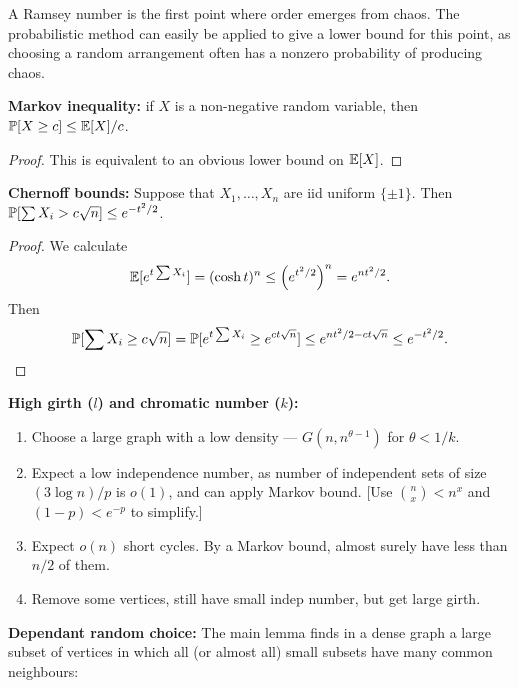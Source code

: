 \documentclass[11pt]{article}
\begin{document}
\begin{recent}
\begin{itemise}
\item A Ramsey number is the first point where order emerges from chaos. The probabilistic method can easily be applied to give a lower bound for this point, as choosing a random arrangement often has a nonzero probability of producing chaos.
\item \textbf{Markov inequality:} if $X$ is a non-negative random variable, then $\operatorname{\mathbb{P}}[X\geq c]\leq\operatorname{\mathbb{E}}[X]/c$.
\begin{proof}
This is equivalent to an obvious lower bound on $\operatorname{\mathbb{E}}[X]$.
\end{proof}
\item \textbf{Chernoff bounds:} Suppose that $X_1,\ldots,X_n$ are iid uniform $\{\pm1\}$. Then $\operatorname{\mathbb{P}}[\sum X_i>c\sqrt n]\leq e^{-t^2/2}$.
\begin{proof}
We calculate
\[\operatorname{\mathbb{E}}[e^{t\sum X_i}]=(\cosh t)^n\leq \left(e^{t^2/2}\right)^n=e^{nt^2/2}.\]
Then
\[\operatorname{\mathbb{P}}[\sum X_i\geq c\sqrt n]=\operatorname{\mathbb{P}}[e^{t\sum X_i}\geq e^{ct\sqrt n}]\leq e^{nt^2/2-ct\sqrt n}\leq e^{-t^2/2}.\qedhere\]
\end{proof}
\item \textbf{High girth ($l$) and chromatic number ($k$):}
\begin{enumerate}\squishlist
\item  Choose a large graph with a low density --- $G(n,n^{\theta-1})$ for $\theta<1/k$.
\item Expect a low independence number, as number of independent sets of size $(3\log n)/p$ is $o(1)$, and can apply Markov bound. [Use ${n\choose x}<n^x$ and $(1-p)<e^{-p}$ to simplify.]
\item Expect $o(n)$ short cycles. By a Markov bound, almost surely have less than $n/2$ of them.
\item Remove some vertices, still have small indep number, but get large girth.
\end{enumerate}
\item \textbf{Dependant random choice:} 
The main lemma finds in a dense graph a large subset of vertices in which all (or almost all) small subsets have many common neighbours:



\end{itemise}
\end{recent}
\end{document}
